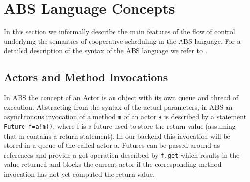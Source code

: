 

\section{ABS Language Concepts}
\label{lang}
In this section we informally describe the main features of the flow of control
underlying the semantics of cooperative scheduling in the ABS language.
For a detailed description of the syntax of the ABS language we refer to~\cite{abs}.


\subsection{Actors and Method Invocations}\label{amc}
In ABS the concept of an Actor is an object with its own queue and thread of execution.
Abstracting from the syntax of the actual parameters,
in ABS an asynchronous invocation of a method \texttt{m} of an actor \texttt{a} is described by a statement
\texttt{Future f=a!m()}, where f is a future used to store the return value
(assuming that m contains a return statement).
In our backend this invocation will be stored in a queue of the called actor a.
Futures can be passed around as references and provide a get operation
described by \texttt{f.get} which results in the value returned and blocks
the current actor if the corresponding method invocation has not yet computed
the return value.

